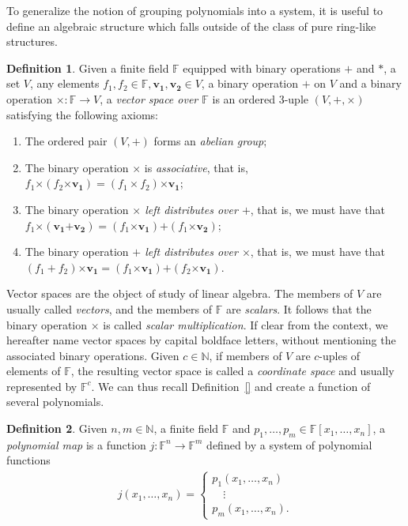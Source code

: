 \documentclass[draft, 12pt, a4paper, oneside]{memoir}
\theoremstyle{definition}
\newtheorem{definition}{Definition}[section]
\theoremstyle{remark}
\begin{document}
To generalize the notion of grouping polynomials into a system, it is useful to define an algebraic structure which falls outside of the class of pure ring-like structures.

\begin{definition}
  Given a finite field $\mathbb{F}$ equipped with binary operations $+$ and $\ast$, a set $V$, any elements $f_{1}, f_{2} \in \mathbb{F}, \mathbf{v_{1}}, \mathbf{v_{2}} \in V$, a binary operation $\bm{+}$ on $V$ and a binary operation $\bm{\times} : \mathbb{F} \to V$, a \emph{vector space over $\mathbb{F}$} is an ordered $3$-uple $(V, \bm{+}, \bm{\times})$ satisfying the following axioms:
  
  \begin{enumerate}
    \item The ordered pair $(V, \bm{+})$ forms an \emph{abelian group};
    \item The binary operation $\bm{\times}$ is \emph{associative}, that is, $f_{1} \bm{\times} (f_{2} \bm{\times} \mathbf{v_{1}}) = (f_{1} \times f_{2}) \bm{\times} \mathbf{v_{1}}$;
    \item The binary operation \emph{$\bm{\times}$ left distributes over $\bm{+}$}, that is, we must have that $f_{1} \bm{\times} (\mathbf{v_{1}} \bm{+} \mathbf{v_{2}}) = (f_{1} \bm{\times} \mathbf{v_{1}}) \bm{+} (f_{1} \bm{\times} \mathbf{v_{2}})$;
    \item The binary operation \emph{$\bm{+}$ left distributes over $\bm{\times}$}, that is, we must have that $(f_{1} + f_{2}) \bm{\times} \mathbf{v_{1}} = (f_{1} \bm{\times} \mathbf{v_{1}}) \bm{+} (f_{2} \bm{\times} \mathbf{v_{1}})$.
  \end{enumerate}
\end{definition}

Vector spaces are the object of study of linear algebra. The members of $V$ are usually called \emph{vectors}, and the members of $\mathbb{F}$ are \emph{scalars}. It follows that the binary operation $\bm{\times}$ is called \emph{scalar multiplication}. If clear from the context, we hereafter name vector spaces by capital boldface letters, without mentioning the associated binary operations. Given $c \in \mathbb{N}$, if members of $V$ are $c$-uples of elements of $\mathbb{F}$, the resulting vector space is called a \emph{coordinate space} and usually represented by $\mathbb{F}^{c}$. We can thus recall Definition~\ref{} and create a function of several polynomials.

\begin{definition}
  Given $n, m \in \mathbb{N}$, a finite field $\mathbb{F}$ and $p_{1}, \dots, p_{m} \in \mathbb{F}[x_{1}, \dots, x_{n}]$, a \emph{polynomial map} is a function $j : \mathbb{F}^{n} \to \mathbb{F}^{m}$ defined by a system of polynomial functions
  \begin{align*}
    j(x_{1}, \dots, x_{n}) =
    \begin{cases}
      p_{1}(x_{1}, \dots, x_{n}) \\
      \quad \vdots \\
      p_{m}(x_{1}, \dots, x_{n}).
    \end{cases}
  \end{align*}
\end{definition}
\end{document}
